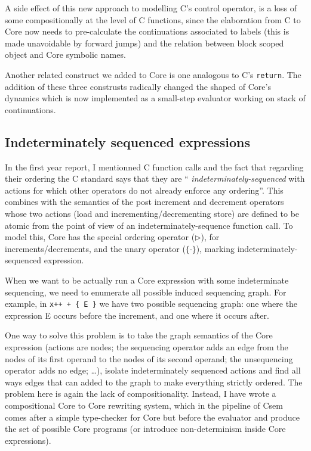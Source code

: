 \documentclass[11pt,a4paper,twocolumn]{article}
\begin{document}
A side effect of this new approach to modelling C's control operator,
is a loss of some compositionally at the level of C functions, since
the elaboration from C to Core now needs to pre-calculate the
continuations associated to labels (this is made unavoidable by
forward jumps) and the relation between block scoped object and Core
symbolic names.

Another related construct we added to Core is one analogous to C's
\texttt{return}. The addition of these three construsts radically
changed the shaped of Core's dynamics which is now implemented as a
small-step evaluator working on stack of continuations.


\subsection*{Indeterminately sequenced expressions}

In the first year report, I mentionned C function calls and the fact
that regarding their ordering the C standard says that they are ``{\it
  indeterminately-sequenced} with actions for which other operators do
not already enforce any ordering''. This combines with the semantics
of the post increment and decrement operators whose two actions (load
and incrementing/decrementing store) are defined to be atomic from the
point of view of an indeterminately-sequence function call. To model
this, Core has the special ordering operator ($\rhd$), for
increments/decrements, and the unary operator ($\{ \cdot \}$), marking
indeterminately-sequenced expression.

When we want to be actually run a Core expression with some
indeterminate sequencing, we need to enumerate all possible induced
sequencing graph. For example, in \texttt{x++~+~\{ E \}} we have two
possible sequencing graph: one where the expression E occurs before
the increment, and one where it occurs after.

One way to solve this problem is to take the graph semantics of the
Core expression (actions are nodes; the sequencing operator adds an
edge from the nodes of its first operand to the nodes of its second
operand; the unsequencing operator adds no edge; \dots), isolate
indeterminately sequenced actions and find all ways edges that can
added to the graph to make everything strictly ordered. The problem
here is again the lack of compositionality. Instead, I have wrote a
compositional Core to Core rewriting system, which in the pipeline of
Csem comes after a simple type-checker for Core but before the
evaluator and produce the set of possible Core programs (or introduce
non-determinism inside Core expressions).
\end{document}

